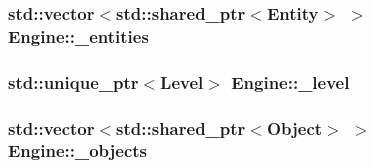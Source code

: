 \subsubsection[{\-\_\-entities}]{\setlength{\rightskip}{0pt plus 5cm}std\-::vector$<$std\-::shared\-\_\-ptr$<${\bf Entity}$>$ $>$ Engine\-::\-\_\-entities\hspace{0.3cm}{\ttfamily [private]}}\label{class_engine_a90ecd2e19f67f9996f1aec37d5705db4}
\subsubsection[{\-\_\-level}]{\setlength{\rightskip}{0pt plus 5cm}std\-::unique\-\_\-ptr$<${\bf Level}$>$ Engine\-::\-\_\-level\hspace{0.3cm}{\ttfamily [private]}}\label{class_engine_a5bb30d48525cf6b261baaa2b89d84934}
\subsubsection[{\-\_\-objects}]{\setlength{\rightskip}{0pt plus 5cm}std\-::vector$<$std\-::shared\-\_\-ptr$<${\bf Object}$>$ $>$ Engine\-::\-\_\-objects\hspace{0.3cm}{\ttfamily [private]}}\label{class_engine_a5c65cb06c180f149b18e81c1beb2f945}
